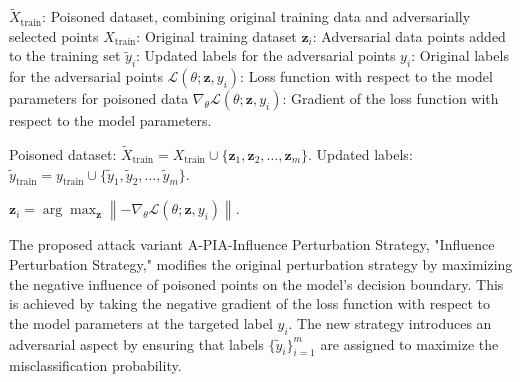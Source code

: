 $\tilde{X}_{\text{train}}$: Poisoned dataset, combining original training data and adversarially selected points  
$X_{\text{train}}$: Original training dataset  
$\mathbf{z}_i$: Adversarial data points added to the training set  
$\tilde{y}_i$: Updated labels for the adversarial points  
$y_i$: Original labels for the adversarial points  
$\mathcal{L}(\theta; \mathbf{z}, y_i)$: Loss function with respect to the model parameters for poisoned data  
$\nabla_\theta \mathcal{L}(\theta; \mathbf{z}, y_i)$: Gradient of the loss function with respect to the model parameters.  


Poisoned dataset: $\tilde{X}_{\text{train}} = X_{\text{train}} \cup \{\mathbf{z}_1, \mathbf{z}_2, \ldots, \mathbf{z}_m\}$.
Updated labels: $\tilde{y}_{\text{train}} = y_{\text{train}} \cup \{\tilde{y}_1, \tilde{y}_2, \ldots, \tilde{y}_m\}$.

$\mathbf{z}_i = \arg \max_{\mathbf{z}} \left\| -\nabla_\theta \mathcal{L}(\theta; \mathbf{z}, y_i) \right\|$.

The proposed attack variant A-PIA-Influence Perturbation Strategy, "Influence Perturbation Strategy," modifies the original perturbation strategy by maximizing the negative influence of poisoned points on the model's decision boundary. This is achieved by taking the negative gradient of the loss function with respect to the model parameters at the targeted label $y_i$. The new strategy introduces an adversarial aspect by ensuring that labels $\{\tilde{y}_i\}_{i=1}^m$ are assigned to maximize the misclassification probability.